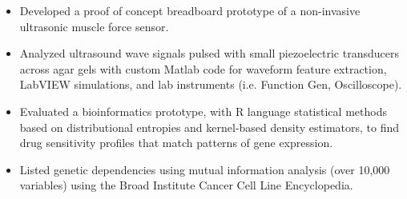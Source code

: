 \documentclass[10pt,a4paper]{altacv}
\begin{document}
\medskip





\begin{itemize}
  \item \small{Developed a proof of concept breadboard prototype of a non-invasive ultrasonic muscle force sensor.}
  \item Analyzed ultrasound wave signals pulsed with small piezoelectric transducers across agar gels with custom Matlab code for waveform feature extraction, LabVIEW simulations, and lab instruments (i.e. Function Gen, Oscilloscope).
\end{itemize}




\begin{itemize}
  \item \small{Evaluated a bioinformatics prototype, with R language statistical methods based on distributional entropies and kernel-based density estimators, to find drug sensitivity profiles that match patterns of gene expression.}
  \item Listed genetic dependencies using mutual information analysis (over 10,000 variables) using the Broad Institute Cancer Cell Line Encyclopedia. 
\end{itemize}







\end{document}
